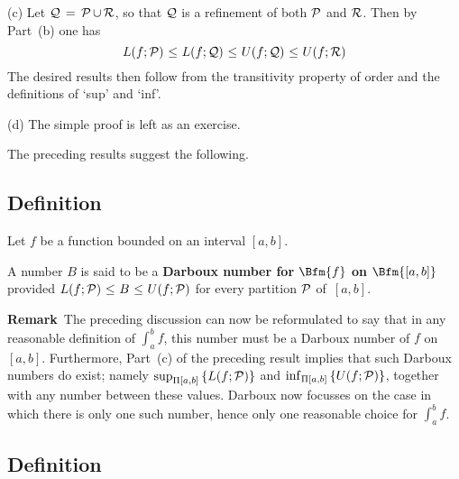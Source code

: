 \V


        (c) Let ${\cal Q} \,=\, {\cal P}\,{\cup}\,{\cal R}$, so that ${\cal Q}$ is a refinement of both ${\cal P}$ and ${\cal R}$. Then by Part~(b) one has
        \begin{displaymath}
        L(f;{\cal P})\,\,{\leq}\,\,L(f;{\cal Q})\,\,{\leq}\,\,U(f;{\cal Q})\,\,{\leq}\,\,U(f;{\cal R})
        \end{displaymath}
        The desired results then follow from the transitivity property of order and the definitions of `sup' and `inf'.

\V

        (d) The simple proof is left as an exercise. %

\V

        The preceding results suggest the following.

\V

        \subsection{\small{{\bf Definition}}}
        \label{DefH20.25}


\V

        Let $f$ be a function bounded on an interval $[a,b]$.

\V

        A number $B$ is said to be a {\bf Darboux number for $\Bfm{f}$ on $\Bfm{[a,b]}$}
    provided $L(f;{\cal P})\,\,{\leq}\,\,B\,\,{\leq}\,\,U(f;{\cal P})$ for every partition ${\cal P}$ of~$[a,b]$.

\V

        {\bf Remark}\, The preceding discussion can now be reformulated to say that in any reasonable definition of $\int_{a}^{b} f$,
    this number must be a Darboux number of $f$ on~$[a,b]$. Furthermore, Part~(c) of the preceding result implies that such Darboux numbers do exist; 
    namely ${\sup}_{{\Pi}[a,b]}\,\{L(f;{\cal P})\}$ and ${\inf}_{{\Pi}[a,b]}\,\{U(f;{\cal P})\}$,
    together with any number between these values. Darboux now focusses on the case in which there is only one such number,
    hence only one reasonable choice for $\int_{a}^{b} f$.

\V

        \subsection{\small{{\bf Definition}}}
        \label{DefH20.25A}

